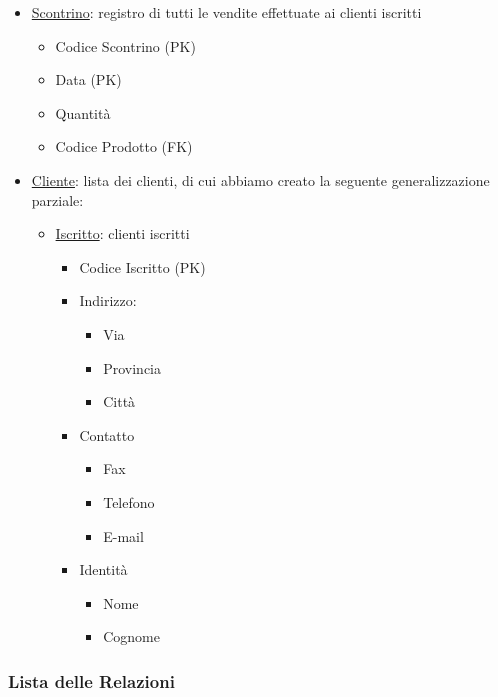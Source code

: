 \begin{itemize}
\item \underline{Scontrino}: registro di tutti le vendite effettuate ai clienti iscritti
  \begin{itemize}
  \item Codice Scontrino (PK)
  \item Data (PK)
  \item Quantit\`a
  \item Codice Prodotto (FK)
  \end{itemize}

\item \underline{Cliente}: lista dei clienti, di cui abbiamo creato la seguente generalizzazione parziale:
  \begin{itemize}
  \item \underline{Iscritto}: clienti iscritti
    \begin{itemize}
    \item Codice Iscritto (PK)
    \item Indirizzo:
      \begin{itemize}
      \item Via
      \item Provincia
      \item Citt\`a
      \end{itemize}

    \item Contatto
      \begin{itemize}
      \item Fax
      \item Telefono
      \item E-mail
      \end{itemize}

    \item Identit\`a
      \begin{itemize}
      \item Nome
      \item Cognome
      \end{itemize}

    \end{itemize}
  \end{itemize}
  
\end{itemize}


\subsubsection{Lista delle Relazioni}

